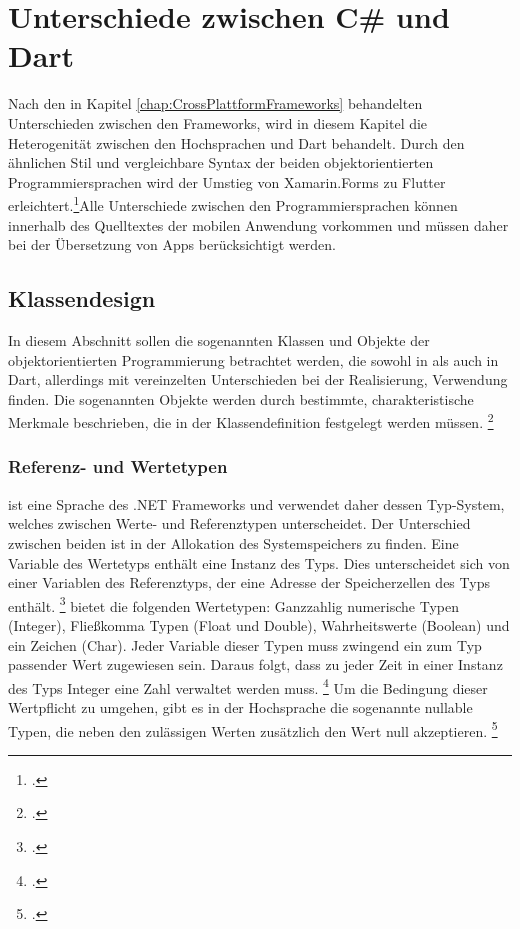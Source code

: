 \chapter{Unterschiede zwischen C\# und Dart}
\label{chap:Programmiersprachen}

Nach den in Kapitel \ref{chap:CrossPlattformFrameworks} behandelten Unterschieden zwischen den Frameworks, wird in diesem Kapitel die Heterogenität zwischen den Hochsprachen \Csharp{} und Dart behandelt.  Durch den ähnlichen Stil und vergleichbare Syntax der beiden objektorientierten Programmiersprachen wird der Umstieg von Xamarin.Forms zu Flutter erleichtert.\footcite[Vgl. ][Abgerufen am \today]{Pedley2019}Alle Unterschiede zwischen den Programmiersprachen können innerhalb des Quelltextes der mobilen Anwendung vorkommen und müssen daher bei der Übersetzung von Apps berücksichtigt werden.

\section{Klassendesign}
In diesem Abschnitt sollen die sogenannten Klassen und Objekte der objektorientierten Programmierung betrachtet werden, die sowohl in \Csharp{} als auch in Dart, allerdings mit vereinzelten Unterschieden bei der Realisierung, Verwendung finden. Die sogenannten Objekte werden durch bestimmte,  charakteristische Merkmale beschrieben,  die in der Klassendefinition festgelegt werden müssen. \footcite[Vgl.][S. 11f.]{Witte2013}

\subsection{Referenz- und Wertetypen}
\Csharp{} ist eine Sprache des \glq .NET Frameworks\grq{} und verwendet daher dessen Typ-System,  welches zwischen Werte- und Referenztypen unterscheidet.  Der Unterschied zwischen beiden ist in der Allokation des Systemspeichers zu finden.  Eine Variable des Wertetyps enthält eine Instanz des Typs.  Dies unterscheidet sich von einer Variablen des Referenztyps, der eine Adresse der Speicherzellen des Typs enthält. \footcite[Vgl.][S. 155f.]{Kühnel2019} \Csharp{} bietet die folgenden Wertetypen: Ganzzahlig numerische Typen (Integer),  Fließkomma  Typen (Float und Double),  Wahrheitswerte (Boolean) und ein Zeichen (Char).  Jeder Variable dieser Typen muss zwingend ein zum Typ passender Wert zugewiesen sein.  Daraus folgt,  dass zu jeder Zeit in einer Instanz des Typs Integer eine Zahl verwaltet werden muss. \footcite[Vgl. ][Abgerufen am \today]{MicrosoftValueTypes2020} Um die Bedingung dieser Wertpflicht zu umgehen,  gibt es in der Hochsprache \Csharp{} die sogenannte \glq nullable\grq{} Typen,  die neben den zulässigen Werten zusätzlich den Wert \glq null\grq{} akzeptieren. \footcite[Vgl.][S. 167]{Bayer2008} 

